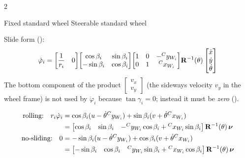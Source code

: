 \begin{multicols}{2}
\begin{twoway}{Fixed standard wheel }{Steerable standard wheel }
\tcblower
{}
\end{twoway}
\begin{fbx}[Standard wheel ($\gamma_i=0$: ``this wheel cannot slide sideways'', \pg{39, 42, 68})]
Slide form ():
\[\dot\varphi_i=\begin{bmatrix}\dfrac1{r_i}&0\end{bmatrix}\!\begin{bmatrix}\cos\beta_i&\sin\beta_i\\-\sin\beta_i&\cos\beta_i\end{bmatrix}\!\begin{bmatrix}1&0&-{}^{C}y_{W_{i}}\\0&1&{}^{C}x_{W_{i}}\end{bmatrix}\!\mathbf R^{-1}(\theta)\begin{bmatrix}\dot x\\\dot y\\\dot\theta\end{bmatrix}\]
The bottom component of the product $\begin{bmatrix}v_x\\v_y\end{bmatrix}$ (the sideways velocity $v_y$ in the wheel frame) is not used by $\dot\varphi_i$ because $\tan\gamma_i=0$; instead it must be \emph{zero} ().
\end{fbx}
\begin{fbx}
\begin{align*}
\text{rolling:}\quad r_i\dot\varphi_i&=\cos\beta_i(u-\dot\theta\wXy i)+\sin\beta_i(v+\dot\theta\wXx i)\\
&=\begin{bmatrix}\cos\beta_i&\sin\beta_i&-\wXy i\cos\beta_i+\wXx i\sin\beta_i\end{bmatrix}\mathbf R^{-1}(\theta)\,\wXn\\
\text{no-sliding:}\quad 0&=-\sin\beta_i(u-\dot\theta\wXy i)+\cos\beta_i(v+\dot\theta\wXx i)\\
&=\begin{bmatrix}-\sin\beta_i&\cos\beta_i&\wXy i\sin\beta_i+\wXx i\cos\beta_i\end{bmatrix}\mathbf R^{-1}(\theta)\,\wXn

\end{align*}
\end{fbx}
\end{multicols}

